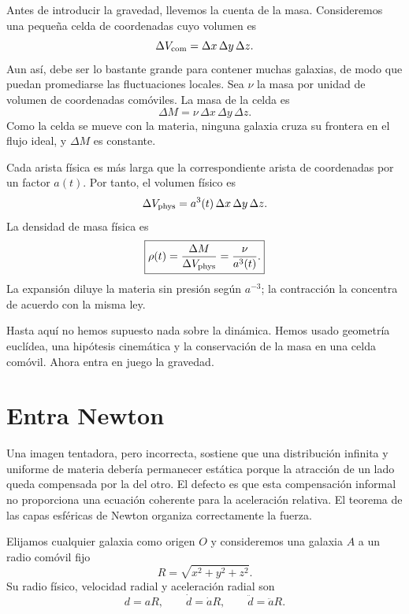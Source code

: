 Antes de introducir la gravedad, llevemos la cuenta de la masa. Consideremos una pequeña celda de coordenadas cuyo volumen es
\begin{equation}
\Delta V_{\rm com}=\Delta x\,\Delta y\,\Delta z.
\end{equation}
Aun así, debe ser lo bastante grande para contener muchas galaxias, de modo que puedan promediarse las fluctuaciones locales. Sea \(\nu\) la masa por unidad de volumen de coordenadas comóviles. La masa de la celda es
\begin{equation}
\Delta M=\nu\,\Delta x\,\Delta y\,\Delta z.
\label{eq:c01-comoving-mass}
\end{equation}
Como la celda se mueve con la materia, ninguna galaxia cruza su frontera en el flujo ideal, y \(\Delta M\) es constante.

Cada arista física es más larga que la correspondiente arista de coordenadas por un factor \(a(t)\). Por tanto, el volumen físico es
\begin{equation}
\Delta V_{\rm phys}=a^3(t)\,\Delta x\,\Delta y\,\Delta z.
\end{equation}
La densidad de masa física es
\begin{equation}
\boxed{\rho(t)=\frac{\Delta M}{\Delta V_{\rm phys}}=\frac{\nu}{a^3(t)}.}
\label{eq:c01-density-dilution}
\end{equation}
La expansión diluye la materia sin presión según \(a^{-3}\); la contracción la concentra de acuerdo con la misma ley.

Hasta aquí no hemos supuesto nada sobre la dinámica. Hemos usado geometría euclídea, una hipótesis cinemática y la conservación de la masa en una celda comóvil. Ahora entra en juego la gravedad.

\section{Entra Newton}

Una imagen tentadora, pero incorrecta, sostiene que una distribución infinita y uniforme de materia debería permanecer estática porque la atracción de un lado queda compensada por la del otro. El defecto es que esta compensación informal no proporciona una ecuación coherente para la aceleración relativa. El teorema de las capas esféricas de Newton organiza correctamente la fuerza.

Elijamos cualquier galaxia como origen \(O\) y consideremos una galaxia \(A\) a un radio comóvil fijo
\begin{equation}
R=\sqrt{x^2+y^2+z^2}.
\end{equation}
Su radio físico, velocidad radial y aceleración radial son
\begin{equation}
d=aR,
\qquad
\dot d=\dot a R,
\qquad
\ddot d=\ddot a R.
\label{eq:c01-radial-kinematics}
\end{equation}

